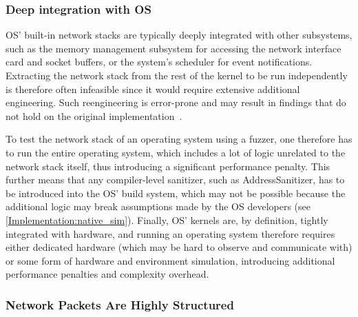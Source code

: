 \documentclass[twocolumn]{article}
\let\savedCite=\cite
\renewcommand{\cite}{\unskip~\savedCite}
\begin{document}
\subsubsection{Deep integration with OS}

OS' built-in network stacks are typically deeply integrated with other subsystems, such as the memory management subsystem for accessing the network interface card and socket buffers, or the system's scheduler for event notifications. Extracting the network stack from the rest of the kernel to be run independently is therefore often infeasible since it would require extensive additional engineering. Such reengineering is error-prone and may result in findings that do not hold on the original implementation\cite{KernelVsUserNetworking}.

To test the network stack of an operating system using a fuzzer, one therefore has to run the entire operating system, which includes a lot of logic unrelated to the network stack itself, thus introducing a significant performance penalty. This further means that any compiler-level sanitizer, such as AddressSanitizer, has to be introduced into the OS' build system, which may not be possible because the additional logic may break assumptions made by the OS developers (see \cref{Implementation:native_sim}). Finally, OS' kernels are, by definition, tightly integrated with hardware, and running an operating system therefore requires either dedicated hardware (which may be hard to observe and communicate with) or some form of hardware and environment simulation, introducing additional performance penalties and complexity overhead.

\subsubsection{Network Packets Are Highly Structured}
\label{Background:TcpIsStructured}
\end{document}
